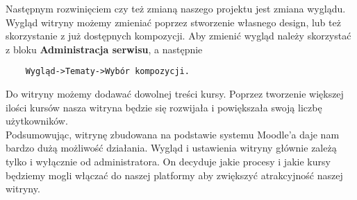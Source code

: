 Następnym rozwinięciem czy też zmianą naszego projektu jest zmiana wyglądu. Wygląd witryny możemy zmieniać poprzez stworzenie własnego design, lub też skorzystanie z już dostępnych kompozycji. Aby zmienić wygląd należy skorzystać z bloku \textbf{Administracja serwisu}, a następnie 
\begin{verbatim}
	Wygląd->Tematy->Wybór kompozycji.
\end{verbatim}
Do witryny możemy dodawać dowolnej treści kursy. Poprzez tworzenie większej ilości kursów nasza witryna będzie się rozwijała i powiększała swoją liczbę użytkowników. \\
Podsumowując, witrynę zbudowana na podstawie systemu Moodle'a daje nam bardzo dużą możliwość działania. Wygląd i ustawienia witryny głównie zależą tylko i wyłącznie od administratora. On decyduje jakie procesy i jakie kursy będziemy mogli włączać do naszej platformy aby zwiększyć atrakcyjność naszej witryny.\\
\\
